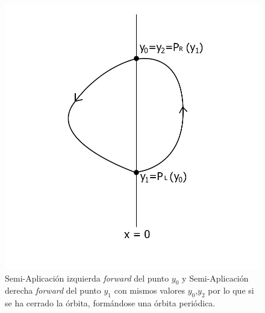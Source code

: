 \documentclass[12pt,a4paper]{report} %
\begin{document}
	\begin{figure}[h]
		\centering
		\includegraphics[width=1\textwidth]{aplipoincareLRcerrado.jpg}
		\caption{Semi-Aplicación izquierda \textit{forward} del punto $y_0$ y Semi-Aplicación derecha \textit{forward} del punto $y_1$ con mismos valores $y_0$,$y_2$ por lo que si se ha cerrado la órbita, formándose una órbita periódica.}
		\label{fig:aplipoincareLRcerrado}
	\end{figure}\smallskip
	
	\newpage
	
\end{document}
